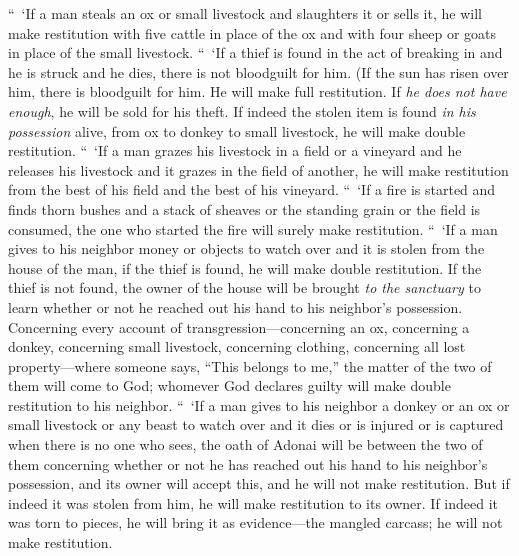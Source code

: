 \begin{biblechapter} %
  “ ‘If a man steals an ox or small livestock and slaughters it or sells it, he will make restitution with five cattle in place of the ox and with four sheep or goats in place of the small livestock.
\verse “ ‘If a thief is found in the act of breaking in and he is struck and he dies, there is not bloodguilt for him.
\verse (If the sun has risen over him, there is bloodguilt for him. He will make full restitution. If \textit{he does not have enough}, he will be sold for his theft.
\verse If indeed the stolen item is found \textit{in his possession} alive, from ox to donkey to small livestock, he will make double restitution.
\verse “ ‘If a man grazes his livestock in a field or a vineyard and he releases his livestock and it grazes in the field of another, he will make restitution from the best of his field and the best of his vineyard.
\verse “ ‘If a fire is started and finds thorn bushes and a stack of sheaves or the standing grain or the field is consumed, the one who started the fire will surely make restitution.
\verse “ ‘If a man gives to his neighbor money or objects to watch over and it is stolen from the house of the man, if the thief is found, he will make double restitution.
\verse If the thief is not found, the owner of the house will be brought \textit{to the sanctuary} to learn whether or not he reached out his hand to his neighbor’s possession.
\verse Concerning every account of transgression—concerning an ox, concerning a donkey, concerning small livestock, concerning clothing, concerning all lost property—where someone says, “This belongs to me,” the matter of the two of them will come to God; whomever God declares guilty will make double restitution to his neighbor.
\verse “ ‘If a man gives to his neighbor a donkey or an ox or small livestock or any beast to watch over and it dies or is injured or is captured when there is no one who sees,
\verse the oath of Adonai will be between the two of them concerning whether or not he has reached out his hand to his neighbor’s possession, and its owner will accept this, and he will not make restitution.
\verse But if indeed it was stolen from him, he will make restitution to its owner.
\verse If indeed it was torn to pieces, he will bring it as evidence—the mangled carcass; he will not make restitution.

\end{biblechapter}
